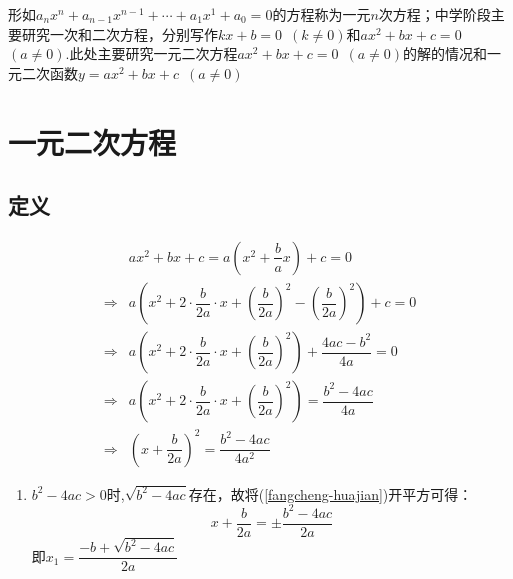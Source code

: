 \documentclass{BHCexam}
\begin{document}
\maketitle
形如$a_nx^n+a_{n-1}x^{n-1}+\cdots +a_{1}x^{1}+a_0=0$的方程称为一元$ n $次方程；中学阶段主要研究一次和二次方程，分别写作$ kx+b=0 $~$(k\ne0)$和$ ax^2+bx+c=0 $~$(a\ne 0)$.此处主要研究一元二次方程$ ax^2+bx+c=0 $~$(a\ne 0)$的解的情况和一元二次函数$ y=ax^2+bx+c $~$(a\ne0)$
\section{一元二次方程}
\subsection{定义}
\begin{equation}\label{fangcheng-huajian}
\begin{split}
&ax^2+bx+c=a\left(x^2+\dfrac{b}{a}x\right)+c=0\\
\Rightarrow&a\left(x^2+2\cdot\dfrac{b}{2a}\cdot x+\left(\dfrac{b}{2a}\right)^2-\left(\dfrac{b}{2a}\right)^2\right)+c=0\\
\Rightarrow&a\left(x^2+2\cdot\dfrac{b}{2a}\cdot x+\left(\dfrac{b}{2a}\right)^2\right)+\dfrac{4ac-b^2}{4a}=0\\
\Rightarrow&a\left(x^2+2\cdot\dfrac{b}{2a}\cdot x+\left(\dfrac{b}{2a}\right)^2\right)=\dfrac{b^2-4ac}{4a}\\
\Rightarrow&\left(x+\dfrac{b}{2a}\right)^2=\dfrac{b^2-4ac}{4a^2}
\end{split}
\end{equation}
\begin{enumerate}[1)]
\item $b^2-4ac>0$时,$\sqrt{b^2-4ac}$存在，故将(\ref{fangcheng-huajian})开平方可得：
\[x+\dfrac{b}{2a}=\pm\dfrac{b^2-4ac}{2a}\]
即$ x_1=\dfrac{-b+\sqrt{b^2-4ac}}{2a} $
\end{enumerate}
\end{document}
